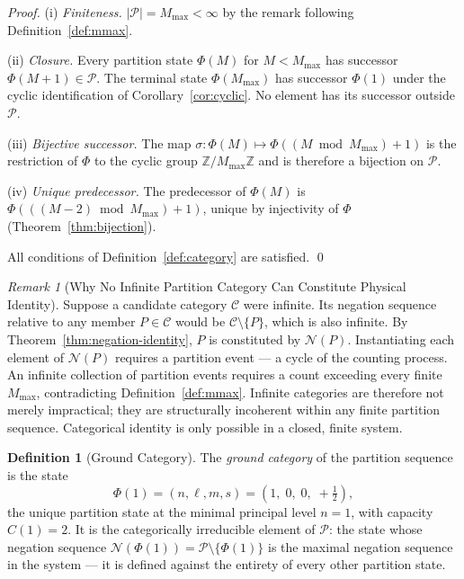 \documentclass[twocolumn,10pt,a4paper]{article}
\theoremstyle{thmstyle}
\theoremstyle{definition}
\newtheorem{definition}[theorem]{Definition}
\theoremstyle{remark}
\newtheorem{remark}[theorem]{Remark}
\newcommand{\Parts}{\mathcal{P}}
\newcommand{\Mmax}{M_{\max}}
\newcommand{\PhiMap}{\varPhi}
\begin{document}
\begin{proof}
(i) \emph{Finiteness.} $|\Parts| = \Mmax < \infty$ by the remark following Definition~\ref{def:mmax}.

(ii) \emph{Closure.} Every partition state $\PhiMap(M)$ for $M < \Mmax$ has successor $\PhiMap(M+1) \in \Parts$. The terminal state $\PhiMap(\Mmax)$ has successor $\PhiMap(1)$ under the cyclic identification of Corollary~\ref{cor:cyclic}. No element has its successor outside $\Parts$.

(iii) \emph{Bijective successor.} The map $\sigma\colon \PhiMap(M) \mapsto \PhiMap\!\left((M \bmod \Mmax) + 1\right)$ is the restriction of $\PhiMap$ to the cyclic group $\mathbb{Z}/\Mmax\mathbb{Z}$ and is therefore a bijection on $\Parts$.

(iv) \emph{Unique predecessor.} The predecessor of $\PhiMap(M)$ is $\PhiMap\!\left(((M-2) \bmod \Mmax) + 1\right)$, unique by injectivity of $\PhiMap$ (Theorem~\ref{thm:bijection}).

All conditions of Definition~\ref{def:category} are satisfied. \qed
\end{proof}

\begin{remark}[Why No Infinite Partition Category Can Constitute Physical Identity]
\label{rem:infinite-cat}
Suppose a candidate category $\mathcal{C}$ were infinite. Its negation sequence relative to any member $P \in \mathcal{C}$ would be $\mathcal{C} \setminus \{P\}$, which is also infinite. By Theorem~\ref{thm:negation-identity}, $P$ is constituted by $\mathcal{N}(P)$. Instantiating each element of $\mathcal{N}(P)$ requires a partition event --- a cycle of the counting process. An infinite collection of partition events requires a count exceeding every finite $\Mmax$, contradicting Definition~\ref{def:mmax}. Infinite categories are therefore not merely impractical; they are structurally incoherent within any finite partition sequence. Categorical identity is only possible in a closed, finite system.
\end{remark}

\begin{definition}[Ground Category]
\label{def:ground-cat}
The \emph{ground category} of the partition sequence is the state
\begin{equation}
    \PhiMap(1) = (n, \ell, m, s) = \left(1,\; 0,\; 0,\; +\tfrac{1}{2}\right),
\end{equation}
the unique partition state at the minimal principal level $n = 1$, with capacity $C(1) = 2$. It is the categorically irreducible element of $\Parts$: the state whose negation sequence $\mathcal{N}(\PhiMap(1)) = \Parts \setminus \{\PhiMap(1)\}$ is the maximal negation sequence in the system --- it is defined against the entirety of every other partition state.
\end{definition}
\end{document}
